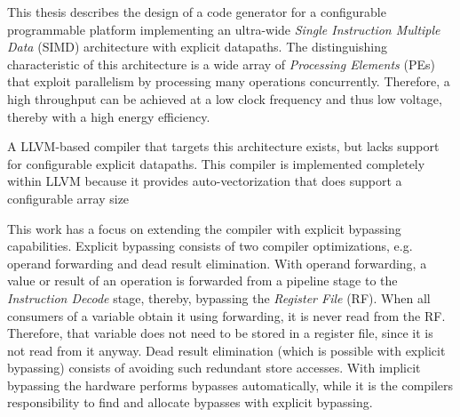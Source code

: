 


This thesis describes the design of a code generator for a configurable programmable platform implementing an ultra-wide \emph{Single Instruction Multiple Data} (SIMD) architecture with explicit datapaths. The distinguishing characteristic of this architecture is a wide array of \emph{Processing Elements} (PEs) that exploit parallelism by processing many operations concurrently. Therefore, a high throughput can be achieved at a low clock frequency and thus low voltage, thereby with a high energy efficiency.

A LLVM-based compiler that targets this architecture exists, but lacks support for configurable explicit datapaths. This compiler is implemented completely within LLVM because it provides auto-vectorization that does support a configurable array size%
 
This work has a focus on extending the compiler with explicit bypassing capabilities. Explicit bypassing consists of two compiler optimizations, e.g. operand forwarding and dead result elimination. With operand forwarding, a value or result of an operation is forwarded from a pipeline stage to the \emph{Instruction Decode} stage, thereby, bypassing the \emph{Register File} (RF). When all consumers of a variable obtain it using forwarding, it is never read from the RF. Therefore, that variable does not need to be stored in a register file, since it is not read from it anyway. Dead result elimination (which is possible with explicit bypassing) consists of avoiding such redundant store accesses. With implicit bypassing the hardware performs bypasses automatically, while it is the compilers responsibility to find and allocate bypasses with explicit bypassing.

